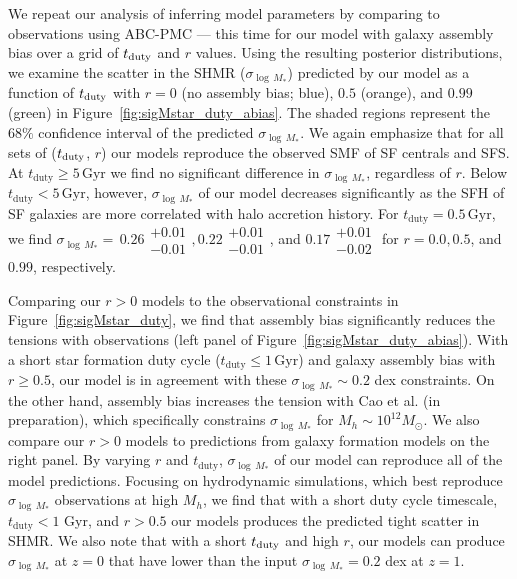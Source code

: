 \documentclass[12pt, letterpaper, preprint, tighten]{aastex62}
\newcommand{\edt}[1]{{\color{dred}{\bf} #1}}
\newcommand{\tduty}{t_{\rm duty}}
\begin{document}
We repeat our analysis of inferring model parameters by comparing to observations 
using ABC-PMC --- this time for our model with galaxy assembly bias over a grid of 
$t_{\rm duty}$ and $r$ values. Using the resulting posterior distributions, we 
examine the scatter in the SHMR ($\sigma_{\log\,M_*}$) predicted by our model as a 
function of $t_{\rm duty}$ with $r=0$ (no assembly bias; blue), $0.5$ (orange), 
and $0.99$ (green) in Figure~\ref{fig:sigMstar_duty_abias}. The shaded regions 
represent the $68\%$ confidence interval of the predicted $\sigma_{\log\,M_*}$. 
We again emphasize that for all sets of ($t_{\rm duty}$, $r$) our models reproduce 
the observed SMF of SF centrals and SFS.  At $t_\mathrm{duty} \geq 5\,\mathrm{Gyr}$ 
we find no significant difference in $\sigma_{\log\,M_*}$, regardless of $r$. 
Below $t_\mathrm{duty} < 5\,\mathrm{Gyr}$, however, $\sigma_{\log\,M_*}$ of our 
model decreases significantly as the SFH of SF galaxies are more correlated 
with halo accretion history.  For $t_\mathrm{duty} = 0.5\,\mathrm{Gyr}$, we find 
$\sigma_{\log\,M_*}{=}\,0.26\substack{+0.01\\-0.01}, 
0.22\substack{+0.01\\-0.01}$, and $0.17\substack{+0.01\\-0.02} $ 
for $r = 0.0, 0.5$, and $0.99$, respectively. 

\edt{Comparing our $r > 0$ models to the observational constraints in 
Figure~\ref{fig:sigMstar_duty}, we find that assembly bias significantly 
reduces the tensions with observations (left panel of 
Figure~\ref{fig:sigMstar_duty_abias})}.  
With a short star formation duty cycle ($t_\mathrm{duty} \leq 1\,\mathrm{Gyr}$) 
and galaxy assembly bias with $r \ge 0.5$, our model is in agreement with 
these $\sigma_{\log\,M_*} \sim 0.2$ dex constraints. On the other hand, 
assembly bias increases the tension with 
\edt{Cao et al. (in preparation), which specifically constrains $\sigma_{\log\,M_*}$ 
for $M_h\sim 10^{12}M_\odot$. We also compare our $r > 0$ models to 
predictions from galaxy formation models on the right panel.}
By varying $r$ and $t_\mathrm{duty}$, $\sigma_{\log\,M_*}$ of our model 
can reproduce all of the model predictions. 
\edt{Focusing on hydrodynamic simulations, which best reproduce $\sigma_{\log\,M_*}$ 
observations at high $M_h$, we find that with a short duty cycle timescale, 
$t_\mathrm{duty} < 1$ Gyr, and $r > 0.5$ our models produces the predicted tight
scatter in SHMR. We also note that with a short $\tduty$ and high $r$, our 
models can produce $\sigma_{\log\,M_*}$ at $z=0$ that have lower than the input 
$\sigma_{\log\,M_*} = 0.2$ dex at $z=1$. 
} 
\end{document}
